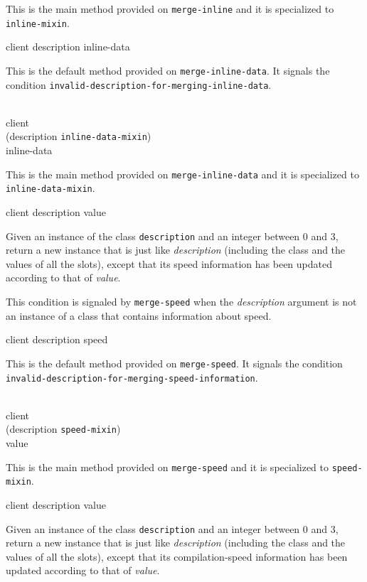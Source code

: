 This is the main method provided on \texttt{merge-inline}
and it is specialized to \texttt{inline-mixin}.

{\footnotesize
{} {client description inline-data}
}

This is the default method provided on \texttt{merge-inline-data}.  It
signals the condition
\texttt{invalid-description-for-merging-inline-data}.

{\footnotesize
{}\\
           {client\\
            (description {\tt inline-data-mixin})\\
            inline-data}
}

This is the main method provided on \texttt{merge-inline-data}
and it is specialized to \texttt{inline-data-mixin}.

{\footnotesize
{} {client description value}
}

Given an instance of the class \texttt{description} and an
integer between $0$ and $3$, return a new instance that is just like
\textit{description} (including the class and the values of
all the slots), except that its speed information has been updated
according to that of \textit{value}.

{\footnotesize
{}
}

This condition is signaled by \texttt{merge-speed} when the
\textit{description} argument is not an instance of a class that
contains information about speed.

{\footnotesize
{} {client description speed}
}

This is the default method provided on \texttt{merge-speed}.  It
signals the condition
\texttt{invalid-description-for-merging-speed-information}.

{\footnotesize
{}\\
           {client\\
            (description {\tt speed-mixin})\\
            value}
}

This is the main method provided on \texttt{merge-speed} and it is
specialized to \texttt{speed-mixin}.

{\footnotesize
{} {client description value}
}

Given an instance of the class \texttt{description} and an
integer between $0$ and $3$, return a new instance that is just like
\textit{description} (including the class and the values of
all the slots), except that its compilation-speed information has been
updated according to that of \textit{value}.

